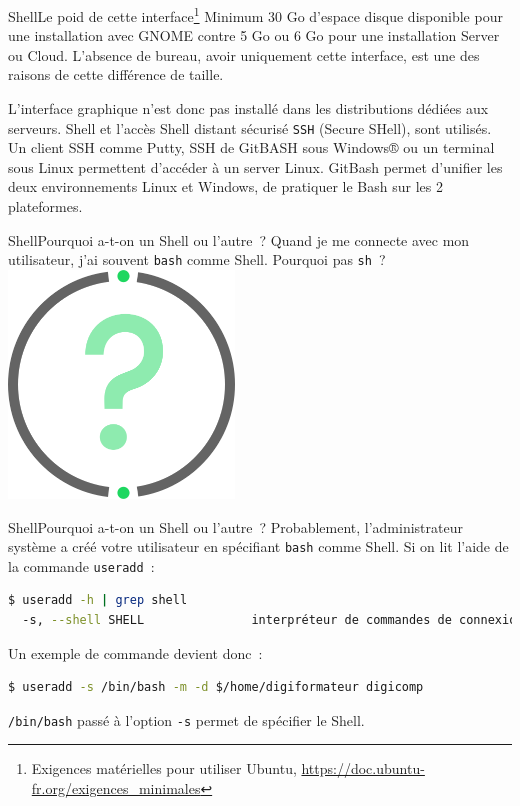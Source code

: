\documentclass{beamer}
\begin{document}
    \begin{frame}{Shell}{Le poid de cette interface\footnote{Exigences matérielles pour utiliser Ubuntu, \url{https://doc.ubuntu-fr.org/exigences_minimales}}}
        Minimum 30 Go d'espace disque disponible pour une installation avec GNOME contre 5 Go ou 6 Go pour une installation Server ou Cloud.
        \bigbreak
        L'absence de bureau, avoir uniquement cette interface, est une des raisons de cette différence de taille.

        L'interface graphique n'est donc pas installé dans les distributions dédiées aux serveurs.
        Shell et l'accès Shell distant sécurisé \lstinline{SSH} (Secure SHell), sont utilisés.
        Un client SSH comme Putty, SSH de GitBASH sous Windows® ou un terminal sous Linux permettent d'accéder à un server Linux.
        \bigbreak
        GitBash permet d'unifier les deux environnements Linux et Windows, de pratiquer le Bash sur les 2 plateformes.
    \end{frame}

    \begin{frame}{Shell}{Pourquoi a-t-on un Shell ou l'autre~?}
        Quand je me connecte avec mon utilisateur, j'ai souvent \lstinline{bash} comme Shell.
        Pourquoi pas \lstinline{sh}~?
        \bigbreak
        \centering
        \includegraphics[width=6cm]{image/question-mark}
    \end{frame}

    \begin{frame}[fragile]{Shell}{Pourquoi a-t-on un Shell ou l'autre~?}
        Probablement, l'administrateur système a créé votre utilisateur en spécifiant \lstinline{bash} comme Shell.
        \bigbreak
        Si on lit l'aide de la commande \lstinline{useradd}~:
        \begin{lstlisting}[language=bash]
$ useradd -h | grep shell
  -s, --shell SHELL               interpréteur de commandes de connexion du nouveau compte
        \end{lstlisting}
        \bigbreak
        Un exemple de commande devient donc~:
        \begin{lstlisting}[language=bash]
$ useradd -s /bin/bash -m -d $/home/digiformateur digicomp
        \end{lstlisting}
        \bigbreak
        \lstinline{/bin/bash} passé à l'option \lstinline{-s} permet de spécifier le Shell.
    \end{frame}
\end{document}

